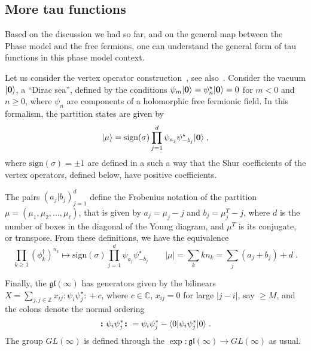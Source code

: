 \documentclass[a4paper,11pt]{amsart}
\begin{document}

\subsection{More tau functions}
Based on the discussion we had so far, and on the general map between 
the Phase model and the free fermions, one can understand the general form 
of tau functions in this phase model context. 

Let us consider the vertex operator construction~\cite{Okounkov2001},
see also~\cite{Alexandrov:2012tr, Wheeler:2010vmq}. Consider the
vacuum \(\lvert\bm{0}\rangle\), a ``Dirac sea'', defined by the conditions \(\psi_m\lvert\bm{0}\rangle
= \psi_n^\star\lvert\bm{0}\rangle =0 \) for \(m<0\) and \(n \geq 0\), where 
\(\psi_n\) are components of a holomorphic free fermionic field. 
In this formalism, the partition states are given by 
\begin{equation}
  \lvert\mu\rangle = \textrm{sign}(\sigma) \prod_{j=1}^d \psi_{a_j} \psi^\star_{-b_j}\lvert\bm{0}\rangle\; ,
\end{equation}
where \(\textrm{sign}(\sigma) = \pm 1\) are defined in a such a way
that the Shur coefficients of the vertex operators, defined below,
have positive coefficients.

The pairs \((a_j|b_j)_{j=1}^d\) define the Frobenius notation of the
partition \(\mu = (\mu_1, \mu_2, \dots, \mu_\ell)\), that is given by
\(a_j = \mu_j - j\) and \(b_j = \mu^T_j - j\), where \(d\) is the
number of boxes in the diagonal of the Young diagram, and \(\mu^T\) is
its conjugate, or transpose.  From these definitions, we have the
equivalence
\begin{equation}
  \prod_{k\geq 1} (\phi_k^\dagger)^{n_k} \mapsto \textrm{sign}(\sigma) \prod_{j=1}^d
  \psi_{a_j} \psi^\star_{-b_j} \qquad |\mu| = \sum_k k n_k = \sum_j(a_j + b_j) + d\; .
\end{equation}

Finally, the \(\mathfrak{gl}(\infty)\) has generators given by the
bilinears \(X = \sum_{j, j \in \mathbb{Z}} x_{ij} \bm{\colon} \psi_i \psi_j^\star\bm{\colon}
+ c\), where \(c\in \mathbb{C}\), \(x_{ij} =
0\) for large \(|j -i|\), say \(\geq M\), and the colons denote the normal ordering
\begin{equation}
  \bm{\colon} \psi_i \psi_j^\ast \bm{\colon} =  \psi_i \psi_j^\ast
  - \langle0\rvert \psi_i \psi_j^\ast \lvert0\rangle \; .
\end{equation}
The group \(GL(\infty)\) is defined through the \(\exp:
\mathfrak{gl}(\infty) \to GL(\infty)\) as usual.
\end{document}
